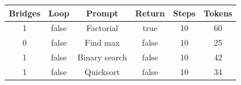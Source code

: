 \begin{table}[h]
\centering
\begin{tabular}{ |c|c|c|c|c|c| }
\hline
Bridges & Loop & Prompt & Return & Steps & Tokens \\
\hline
1 & false & Factorial & true & 10 & 60 \\
\hline
0 & false & Find max & false & 10 & 25 \\
\hline
1 & false & Binary search & false & 10 & 42 \\
\hline
1 & false & Quicksort & false & 10 & 34 \\
\hline
\end{tabular}
\end{table}
